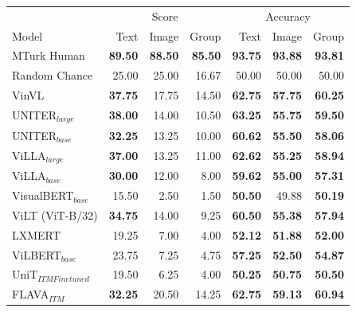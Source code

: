 \begin{table}[ht]
\centering
\begin{tabular}{l|rrr|rrr}
\toprule
 &
  \multicolumn{3}{c|}{{Score}} &
  \multicolumn{3}{c}{{Accuracy}} \\
 Model                               & Text           & Image          & Group          & Text       & Image      & Group      \\
\midrule
 MTurk Human                         & \textbf{89.50} & \textbf{88.50} & \textbf{85.50} & \textbf{93.75} & \textbf{93.88} & \textbf{93.81} \\
 Random Chance                       & 25.00          & 25.00          & 16.67          & 50.00          & 50.00          & 50.00          \\
 \midrule
 VinVL                        & \textbf{37.75} & 17.75          & 14.50          & \textbf{62.75} & \textbf{57.75} & \textbf{60.25} \\
 UNITER$_{large}$             & \textbf{38.00} & 14.00          & 10.50          & \textbf{63.25} & \textbf{55.75} & \textbf{59.50} \\
 UNITER$_{base}$              & \textbf{32.25} & 13.25          & 10.00          & \textbf{60.62} & \textbf{55.50} & \textbf{58.06} \\
 ViLLA$_{large}$              & \textbf{37.00} & 13.25          & 11.00          & \textbf{62.62} & \textbf{55.25} & \textbf{58.94} \\
 ViLLA$_{base}$               & \textbf{30.00} & 12.00          & 8.00           & \textbf{59.62} & \textbf{55.00} & \textbf{57.31} \\
 VisualBERT$_{base}$          & 15.50          & 2.50           & 1.50           & \textbf{50.50} & 49.88          & \textbf{50.19} \\
 ViLT (ViT-B/32)              & \textbf{34.75} & 14.00          & 9.25           & \textbf{60.50} & \textbf{55.38} & \textbf{57.94} \\
 LXMERT                       & 19.25          & 7.00           & 4.00           & \textbf{52.12} & \textbf{51.88} & \textbf{52.00} \\
 ViLBERT$_{base}$             & 23.75          & 7.25           & 4.75           & \textbf{57.25} & \textbf{52.50} & \textbf{54.87} \\
 UniT$_{ITM Finetuned}$       & 19.50          & 6.25           & 4.00           & \textbf{50.25} & \textbf{50.75} & \textbf{50.50} \\
 FLAVA$_{ITM}$                & \textbf{32.25} & 20.50          & 14.25          & \textbf{62.75} & \textbf{59.13} & \textbf{60.94} \\

\end{tabular}
\end{table}
